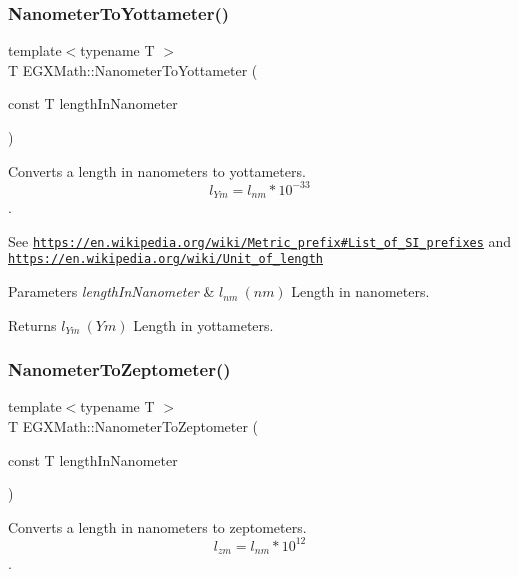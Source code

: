 \subsubsection{\texorpdfstring{Nanometer\+To\+Yottameter()}{NanometerToYottameter()}}
{\footnotesize\ttfamily template$<$typename T $>$ \\
T E\+G\+X\+Math\+::\+Nanometer\+To\+Yottameter (\begin{DoxyParamCaption}\item[{const T}]{length\+In\+Nanometer }\end{DoxyParamCaption})}



Converts a length in nanometers to yottameters. \[ l_{Ym}=l_{nm} * 10^{-33} \]. 

See \href{https://en.wikipedia.org/wiki/Metric_prefix#List_of_SI_prefixes}{\tt https\+://en.\+wikipedia.\+org/wiki/\+Metric\+\_\+prefix\#\+List\+\_\+of\+\_\+\+S\+I\+\_\+prefixes} and \href{https://en.wikipedia.org/wiki/Unit_of_length}{\tt https\+://en.\+wikipedia.\+org/wiki/\+Unit\+\_\+of\+\_\+length} 
\begin{DoxyParams}{Parameters}
{\em length\+In\+Nanometer} & $ l_{nm}\ (nm)$ Length in nanometers. \\
\hline
\end{DoxyParams}
\begin{DoxyReturn}{Returns}
$ l_{Ym}\ (Ym)$ Length in yottameters. 
\end{DoxyReturn}
\mbox{\label{group___e_g_x_math-_conversions-_length_conversions-_s_i-_nanometer-_s_i_ga3104d856008f94fc14378e95cfbe771f}} 
\subsubsection{\texorpdfstring{Nanometer\+To\+Zeptometer()}{NanometerToZeptometer()}}
{\footnotesize\ttfamily template$<$typename T $>$ \\
T E\+G\+X\+Math\+::\+Nanometer\+To\+Zeptometer (\begin{DoxyParamCaption}\item[{const T}]{length\+In\+Nanometer }\end{DoxyParamCaption})}



Converts a length in nanometers to zeptometers. \[ l_{zm}=l_{nm} * 10^{12} \]. 

